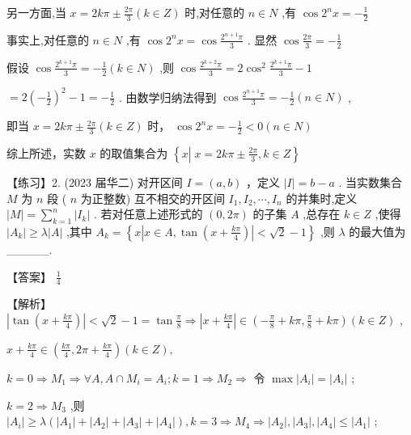 \documentclass[10pt]{article}
\begin{document}
另一方面,当 \(x = {2k\pi } \pm  \frac{2\pi }{3}\left( {k \in  Z}\right)\) 时,对任意的 \(n \in  N\) ,有 \(\cos {2}^{n}x =  - \frac{1}{2}\)

事实上,对任意的 \(n \in  N\) ,有 \(\cos {2}^{n}x = \cos \frac{{2}^{n + 1}\pi }{3}\) . 显然 \(\cos \frac{2\pi }{3} =  - \frac{1}{2}\)

假设 \(\cos \frac{{2}^{k + 1}\pi }{3} =  - \frac{1}{2}\left( {k \in  N}\right)\) ,则 \(\cos \frac{{2}^{k + 2}\pi }{3} = 2{\cos }^{2}\frac{{2}^{k + 1}\pi }{3} - 1\)

\(= 2{\left( -\frac{1}{2}\right) }^{2} - 1 =  - \frac{1}{2}\) . 由数学归纳法得到 \(\cos \frac{{2}^{n + 1}\pi }{3} =  - \frac{1}{2}\left( {n \in  N}\right)\) ,

即当 \(x = {2k\pi } \pm  \frac{2\pi }{3}\left( {k \in  Z}\right)\) 时， \({\cos {2}^{n}x} =  - \frac{1}{2} < 0\left( {n \in  N}\right)\)

综上所述，实数 \(x\) 的取值集合为 \(\left\{  {x\left| {\;x = {2k\pi } \pm  \frac{2\pi }{3}}\right. ,k \in  Z}\right\}\)

【练习】2. (2023 届华二) 对开区间 \(I = \left( {a,b}\right)\) ，定义 \(\left| I\right|  = b - a\) . 当实数集合 \(M\) 为 \(n\) 段 ( \(n\) 为正整数) 互不相交的开区间 \({I}_{1},{I}_{2},\cdots ,{I}_{n}\) 的并集时,定义 \(\left| M\right|  = \mathop{\sum }\limits_{{k = 1}}^{n}\left| {I}_{k}\right|\) . 若对任意上述形式的 \(\left( {0,{2\pi }}\right)\) 的子集 \(A\) ,总存在 \(k \in  Z\) ,使得 \(\left| {A}_{k}\right|  \geq  \lambda \left| A\right|\) ,其中 \({A}_{k} = \left\{  {x\left| {x \in  A,\tan \left( {x + \frac{k\pi }{4}}\right) }\right|  < \sqrt{2} - 1}\right\}\) ,则 \(\lambda\) 的最大值为\_\_\_\_\_.

【答案】 \(\frac{1}{4}\)

【解析】 \(\left| {\tan \left( {x + \frac{k\pi }{4}}\right) }\right|  < \sqrt{2} - 1 = \tan \frac{\pi }{8} \Rightarrow  \left| {x + \frac{k\pi }{4}}\right|  \in  \left( {-\frac{\pi }{8} + {k\pi },\frac{\pi }{8} + {k\pi }}\right) \left( {k \in  Z}\right)\) ,

\(x + \frac{k\pi }{4} \in  \left( {\frac{k\pi }{4},{2\pi } + \frac{k\pi }{4}}\right) \left( {k \in  Z}\right) ,\)

\(k = 0 \Rightarrow  {M}_{1} \Rightarrow  \forall A,A \cap  {M}_{i} = {A}_{i};k = 1 \Rightarrow  {M}_{2} \Rightarrow\) 令 \(\max \left| {A}_{i}\right|  = \left| {A}_{i}\right|\) ;

\(k = 2 \Rightarrow  {M}_{3}\) ,则 \(\left| {A}_{i}\right|  \geq  \lambda \left( {\left| {A}_{1}\right|  + \left| {A}_{2}\right|  + \left| {A}_{3}\right|  + \left| {A}_{4}\right| }\right) ,k = 3 \Rightarrow  {M}_{4} \Rightarrow  \left| {A}_{2}\right| ,\left| {A}_{3}\right| ,\left| {A}_{4}\right|  \leq  \left| {A}_{1}\right|\) ;
\end{document}
